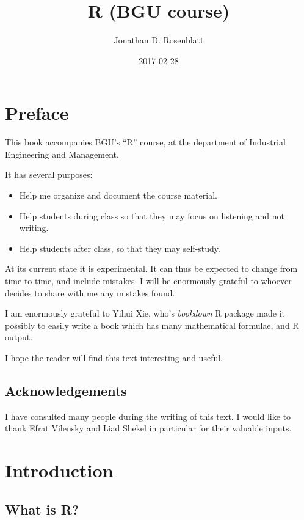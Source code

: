\documentclass[]{book}
\title{R (BGU course)}
\author{Jonathan D. Rosenblatt}
\date{2017-02-28}
\providecommand{\tightlist}{%
  \setlength{\itemsep}{0pt}\setlength{\parskip}{0pt}}
\theoremstyle{definition}
\theoremstyle{definition}
\theoremstyle{remark}
\begin{document}
\maketitle

{
\setcounter{tocdepth}{1}
\tableofcontents
}
\chapter{Preface}\label{preface}

This book accompanies BGU's ``R'' course, at the department of
Industrial Engineering and Management.

It has several purposes:

\begin{itemize}
\tightlist
\item
  Help me organize and document the course material.
\item
  Help students during class so that they may focus on listening and not
  writing.
\item
  Help students after class, so that they may self-study.
\end{itemize}

At its current state it is experimental. It can thus be expected to
change from time to time, and include mistakes. I will be enormously
grateful to whoever decides to share with me any mistakes found.

I am enormously grateful to Yihui Xie, who's \emph{bookdown} R package
made it possibly to easily write a book which has many mathematical
formulae, and R output.

I hope the reader will find this text interesting and useful.

\section{Acknowledgements}\label{acknowledgements}

I have consulted many people during the writing of this text. I would
like to thank Efrat Vilensky and Liad Shekel in particular for their
valuable inputs.

\chapter{Introduction}\label{intro}

\section{What is R?}\label{what-r}
\end{document}
